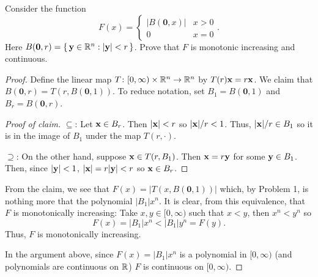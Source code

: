 \begin{problem}
Consider the function
\[
F(x)=
\begin{cases}
|B(\mathbf{0},x)|&x>0\\
0&x=0
\end{cases}.
\]
Here
$B(\mathbf{0},r)=\left\{\,\mathbf{y}\in\mathbb{R}^n:|\mathbf{y}|<r\,\right\}$. Prove
that $F$ is monotonic increasing and continuous.
\end{problem}
\begin{proof}
Define the linear map $T\colon[0,\infty)\times\mathbb{R}^n\to\mathbb{R}^n$ by
$T(r)\mathbf{x}= r\mathbf{x}$. We claim that
$B(\mathbf{0},r)=T(r,B(\mathbf{0},1))$. To reduce notation, set
$B_1= B(\mathbf{0},1)$ and $B_r= B(\mathbf{0},r)$.
\begin{proof}[Proof of claim]
\renewcommand{\qedsymbol}{$\clubsuit$}
$\subseteq$: Let $\mathbf{x}\in B_r$. Then $|\mathbf{x}|<r$ so $|\mathbf{x}|/r<1$. Thus,
$|\mathbf{x}|/r\in B_1$ so it is in the image of $B_1$ under the map
$T(r,\cdot)$.

$\supseteq$: On the other hand, suppose $\mathbf{x}\in T(r,B_1)$. Then
$\mathbf{x}=r\mathbf{y}$ for some $\mathbf{y}\in B_1$. Then, since $|\mathbf{y}|<1$,
$|\mathbf{x}|=r|\mathbf{y}|<r$ so $\mathbf{x}\in B_r$.
\end{proof}

From the claim, we see that $F(x)=|T(x,B(\mathbf{0},1))|$ which, by Problem
1, is nothing more that the polynomial $|B_1|x^n$. It is clear,
from this equivalence, that $F$ is monotonically increasing: Take
$x,y\in[0,\infty)$ such that $x<y$, then $x^n<y^n$ so
\begin{equation}
\label{eq:prep:1:7}
F(x)=|B_1|x^n<|B_1|y^n=F(y).
\end{equation}
Thus, $F$ is monotonically increasing.

In the argument above, since $F(x)=|B_1|x^n$ is a polynomial in
$[0,\infty)$ (and polynomials are continuous on $\mathbb{R}$) $F$ is continuous
on $[0,\infty)$.
\end{proof}


